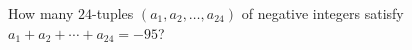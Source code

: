 How many $24$-tuples $(a_1,a_2,\dots,a_{24})$ of negative integers satisfy $a_1+a_2+\cdots+a_{24}=-95$?
